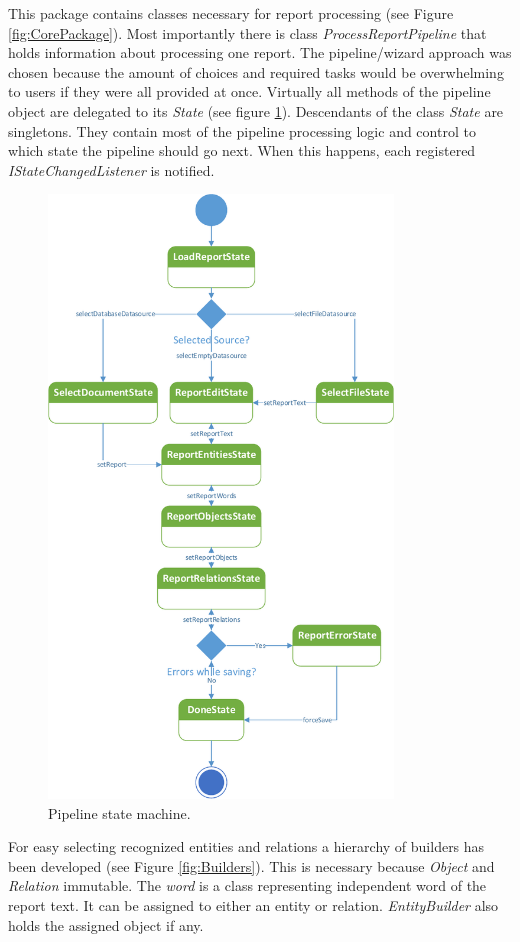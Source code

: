 This package contains classes necessary for report processing (see Figure
\ref{fig:CorePackage}). Most importantly there is class
\emph{ProcessReportPipeline} that holds information about processing one report.
The pipeline/wizard approach was chosen because the amount of choices and
required tasks would be overwhelming to users if they were all provided at once.
Virtually all methods of the pipeline object are delegated to its \emph{State}
(see figure \ref{fig:Pipeline}). Descendants of the class \emph{State} are
singletons. They contain most of the pipeline processing logic and control to
which state the pipeline should go next. When this happens, each registered
\emph{IStateChangedListener} is notified.

\begin{figure}[!htb]
        \centering
        \includegraphics[height=16cm]{Images/Pipeline}
        \caption{Pipeline state machine.}
        \label{fig:Pipeline}
\end{figure}

For easy selecting recognized entities and relations a hierarchy of builders
has been developed (see Figure \ref{fig:Builders}). This is necessary because
\emph{Object} and \emph{Relation} immutable. The \emph{word} is a class
representing independent word of the report text. It can be assigned to either
an entity or relation. \emph{EntityBuilder} also holds the assigned object if
any.

